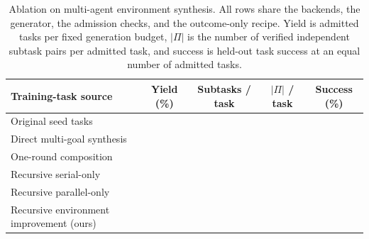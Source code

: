 \begin{table}[t]
\centering
\small
\caption{Ablation on multi-agent environment synthesis. All rows share the backends, the generator, the admission checks, and the outcome-only recipe. Yield is admitted tasks per fixed generation budget, $|\Pi|$ is the number of verified independent subtask pairs per admitted task, and success is held-out task success at an equal number of admitted tasks.}
\label{tab:abl-construction}
\setlength{\tabcolsep}{6pt}
\renewcommand{\arraystretch}{1.12}
\begin{tabular}{@{}lcccc@{}}
\toprule
Training-task source & Yield (\%) \up & Subtasks / task & $|\Pi|$ / task & Success (\%) \up \\
\midrule
Original seed tasks & & & & \\
Direct multi-goal synthesis & & & & \\
One-round composition & & & & \\
Recursive serial-only & & & & \\
Recursive parallel-only & & & & \\
\rowcolor{gray!15}
Recursive environment improvement (ours) & & & & \\
\bottomrule
\end{tabular}
\end{table}
